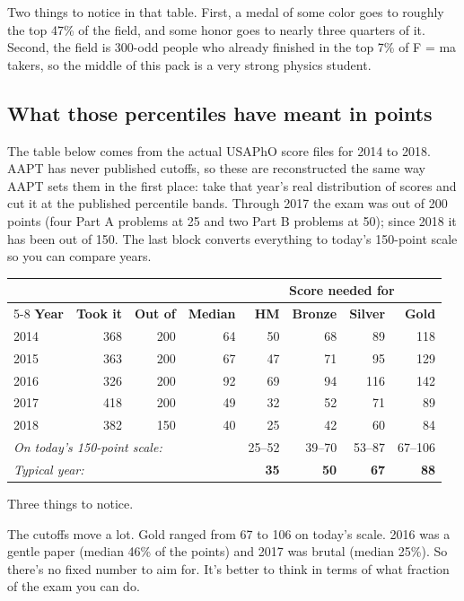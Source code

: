 \documentclass[11pt]{article}
\begin{document}
Two things to notice in that table. First, a medal of some color goes to roughly the top
47\% of the field, and some honor goes to nearly three quarters of it. Second, the field is
300-odd people who already finished in the top 7\% of F = ma takers, so the middle of this
pack is a very strong physics student.

\subsection*{What those percentiles have meant in points}

The table below comes from the actual USAPhO score files for 2014 to 2018. AAPT has never
published cutoffs, so these are reconstructed the same way AAPT sets them in the first
place: take that year's real distribution of scores and cut it at the published percentile
bands. Through 2017 the exam was out of 200 points (four Part A problems at 25 and two
Part B problems at 50); since 2018 it has been out of 150. The last block converts
everything to today's 150-point scale so you can compare years.

\begin{center}
\begin{tabular}{lrrrrrrr}
\hline
& & & & \multicolumn{4}{c}{\textbf{Score needed for}} \\
\cline{5-8}
\textbf{Year} & \textbf{Took it} & \textbf{Out of} & \textbf{Median} &
\textbf{HM} & \textbf{Bronze} & \textbf{Silver} & \textbf{Gold} \\
\hline
2014 & 368 & 200 & 64 & 50 & 68 & 89 & 118 \\
2015 & 363 & 200 & 67 & 47 & 71 & 95 & 129 \\
2016 & 326 & 200 & 92 & 69 & 94 & 116 & 142 \\
2017 & 418 & 200 & 49 & 32 & 52 & 71 & 89 \\
2018 & 382 & 150 & 40 & 25 & 42 & 60 & 84 \\
\hline
\multicolumn{4}{l}{\emph{On today's 150-point scale:}} & 25--52 & 39--70 & 53--87 & 67--106 \\
\multicolumn{4}{l}{\emph{Typical year:}} & \textbf{35} & \textbf{50} & \textbf{67} & \textbf{88} \\
\hline
\end{tabular}
\end{center}

Three things to notice.

The cutoffs move a lot. Gold ranged from 67 to 106 on today's scale. 2016 was a gentle paper
(median 46\% of the points) and 2017 was brutal (median 25\%). So there's no fixed number
to aim for. It's better to think in terms of what fraction of the exam you can do.
\end{document}
